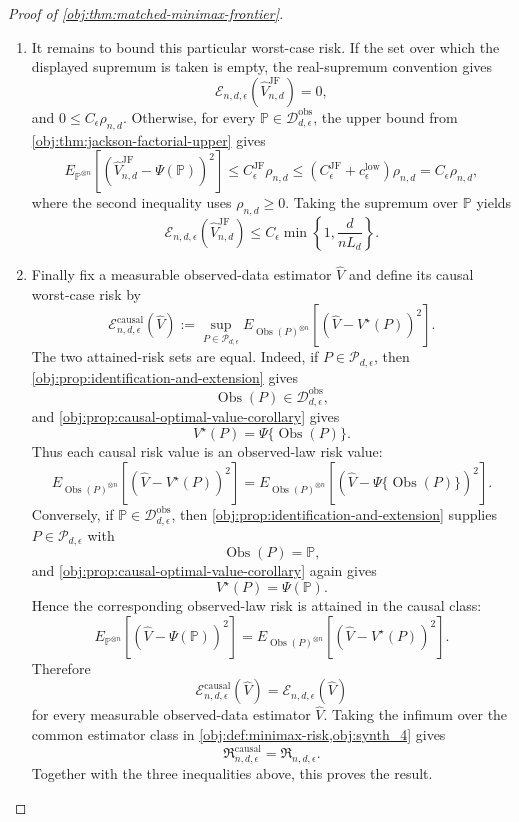 \begin{proof}[Proof of \cref{obj:thm:matched-minimax-frontier}]
\begin{enumerate}
\item It remains to bound this particular worst-case risk.  If the set over which the displayed supremum is taken is empty, the real-supremum convention gives
\[
\mathcal E_{n,d,\epsilon}(\widehat V_{n,d}^{\mathrm{JF}})=0,
\]
and \(0\le C_\epsilon\rho_{n,d}\).  Otherwise, for every \(\mathbb P\in\mathcal D_{d,\epsilon}^{\mathrm{obs}}\), the upper bound from \cref{obj:thm:jackson-factorial-upper} gives
\[
E_{\mathbb P^{\otimes n}}
\left[
  \left(\widehat V_{n,d}^{\mathrm{JF}}-\Psi(\mathbb P)\right)^2
\right]
\le
C_{\epsilon}^{\mathrm{JF}}\rho_{n,d}
\le
(C_{\epsilon}^{\mathrm{JF}}+c_{\epsilon}^{\mathrm{low}})\rho_{n,d}
=
C_\epsilon\rho_{n,d},
\]
where the second inequality uses \(\rho_{n,d}\ge0\).  Taking the supremum over \(\mathbb P\) yields
\[
\mathcal E_{n,d,\epsilon}(\widehat V_{n,d}^{\mathrm{JF}})
\le
C_\epsilon
\min\left\{1,\frac{d}{nL_d}\right\}.
\]

\item Finally fix a measurable observed-data estimator \(\widehat V\) and define its causal worst-case risk by
\[
\mathcal E^{\mathrm{causal}}_{n,d,\epsilon}(\widehat V)
:=
\sup_{P\in\mathcal P_{d,\epsilon}}
E_{\operatorname{Obs}(P)^{\otimes n}}
\left[
  \left(\widehat V-V^\star(P)\right)^2
\right].
\]
The two attained-risk sets are equal.  Indeed, if \(P\in\mathcal P_{d,\epsilon}\), then \cref{obj:prop:identification-and-extension} gives
\[
\operatorname{Obs}(P)\in\mathcal D_{d,\epsilon}^{\mathrm{obs}},
\]
and \cref{obj:prop:causal-optimal-value-corollary} gives
\[
V^\star(P)=\Psi\{\operatorname{Obs}(P)\}.
\]
Thus each causal risk value is an observed-law risk value:
\[
E_{\operatorname{Obs}(P)^{\otimes n}}
\left[
  \left(\widehat V-V^\star(P)\right)^2
\right]
=
E_{\operatorname{Obs}(P)^{\otimes n}}
\left[
  \left(\widehat V-\Psi\{\operatorname{Obs}(P)\}\right)^2
\right].
\]
Conversely, if \(\mathbb P\in\mathcal D_{d,\epsilon}^{\mathrm{obs}}\), then \cref{obj:prop:identification-and-extension} supplies \(P\in\mathcal P_{d,\epsilon}\) with
\[
\operatorname{Obs}(P)=\mathbb P,
\]
and \cref{obj:prop:causal-optimal-value-corollary} again gives
\[
V^\star(P)=\Psi(\mathbb P).
\]
Hence the corresponding observed-law risk is attained in the causal class:
\[
E_{\mathbb P^{\otimes n}}
\left[
  \left(\widehat V-\Psi(\mathbb P)\right)^2
\right]
=
E_{\operatorname{Obs}(P)^{\otimes n}}
\left[
  \left(\widehat V-V^\star(P)\right)^2
\right].
\]
Therefore
\[
\mathcal E^{\mathrm{causal}}_{n,d,\epsilon}(\widehat V)
=
\mathcal E_{n,d,\epsilon}(\widehat V)
\]
for every measurable observed-data estimator \(\widehat V\).  Taking the infimum over the common estimator class in \cref{obj:def:minimax-risk,obj:synth_4} gives
\[
\mathfrak R^{\mathrm{causal}}_{n,d,\epsilon}
=
\mathfrak R_{n,d,\epsilon}.
\]
Together with the three inequalities above, this proves the result.
\end{enumerate}
\end{proof}

